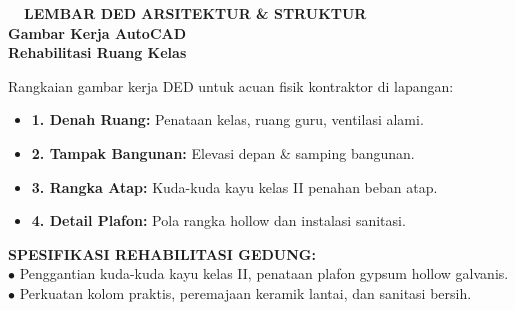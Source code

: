 \documentclass[10pt,a4paper,landscape]{article}
\begin{document}
\noindent
\begin{minipage}[t]{0.30\linewidth}
  \vspace{0pt}
  \begin{tcolorbox}[sharp corners, boxrule=0.8pt, colframe=pborder, colback=white, left=3mm, right=3mm, top=2.5mm, bottom=2.5mm, height=100mm]
    \colorbox{pred}{\fontsize{7pt}{8pt}\selectfont\bfseries\color{white}\ \ LEMBAR DED ARSITEKTUR \& STRUKTUR\ \ }\\[1.5mm]
    {\fontsize{9.5pt}{11.5pt}\selectfont\bfseries\color{pnavy}Gambar Kerja AutoCAD}\\[0.5mm]
    {\fontsize{7pt}{8.5pt}\selectfont\bfseries\color{pred}Rehabilitasi Ruang Kelas}\\[2mm]

    {\fontsize{6.5pt}{8.2pt}\selectfont\color{psteel}
    Rangkaian gambar kerja DED untuk acuan fisik kontraktor di lapangan:
    \begin{itemize}[leftmargin=3mm, itemsep=0.6mm, topsep=0mm]
      \item \textbf{1. Denah Ruang:} Penataan kelas, ruang guru, ventilasi alami.
      \item \textbf{2. Tampak Bangunan:} Elevasi depan \& samping bangunan.
      \item \textbf{3. Rangka Atap:} Kuda-kuda kayu kelas II penahan beban atap.
      \item \textbf{4. Detail Plafon:} Pola rangka hollow dan instalasi sanitasi.
    \end{itemize}
    }
  \end{tcolorbox}
  \vspace{2mm}

  \begin{tcolorbox}[sharp corners, boxrule=0.6pt, colframe=pnavy, colback=pbglight, left=2.5mm, right=2.5mm, top=2mm, bottom=2mm, height=52mm]
    {\fontsize{7pt}{8.5pt}\selectfont\bfseries\color{pnavy}SPESIFIKASI REHABILITASI GEDUNG:}\\[1.5mm]
    {\fontsize{6.5pt}{8.2pt}\selectfont\color{psteel}
    $\bullet$ Penggantian kuda-kuda kayu kelas II, penataan plafon gypsum hollow galvanis.\\
    $\bullet$ Perkuatan kolom praktis, peremajaan keramik lantai, dan sanitasi bersih.
    }
  \end{tcolorbox}
\end{minipage}%
\hfill
\end{document}
